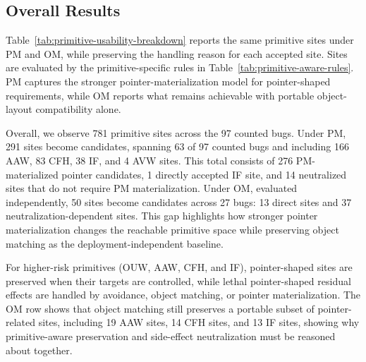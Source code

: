 \subsection{Overall Results}







Table~\ref{tab:primitive-usability-breakdown} reports the same primitive sites under PM and OM, while preserving the handling reason for each accepted site. Sites are evaluated by the primitive-specific rules in Table~\ref{tab:primitive-aware-rules}. PM captures the stronger pointer-materialization model for pointer-shaped requirements, while OM reports what remains achievable with portable object-layout compatibility alone.





Overall, we observe 781 primitive sites across the 97 counted bugs. Under PM, 291 sites become candidates, spanning 63 of 97 counted bugs and including 166 AAW, 83 CFH, 38 IF, and 4 AVW sites. This total consists of 276 PM-materialized pointer candidates, 1 directly accepted IF site, and 14 neutralized sites that do not require PM materialization. Under OM, evaluated independently, 50 sites become candidates across 27 bugs: 13 direct sites and 37 neutralization-dependent sites. This gap highlights how stronger pointer materialization changes the reachable primitive space while preserving object matching as the deployment-independent baseline.

For higher-risk primitives (OUW, AAW, CFH, and IF), pointer-shaped sites are preserved when their targets are controlled, while lethal pointer-shaped residual effects are handled by avoidance, object matching, or pointer materialization. The OM row shows that object matching still preserves a portable subset of pointer-related sites, including 19 AAW sites, 14 CFH sites, and 13 IF sites, showing why primitive-aware preservation and side-effect neutralization must be reasoned about together.

